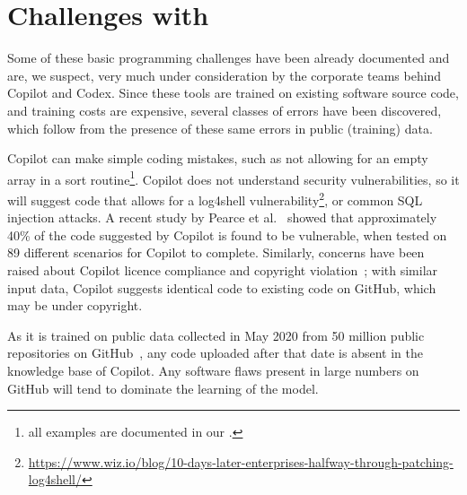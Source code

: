 \section{Challenges with \cct{}}
\label{challenges}
Some of these basic programming challenges have been already documented and are, we suspect, very much under consideration by the corporate teams behind Copilot and Codex. Since these tools are trained on existing software source code, and training costs are expensive, several classes of errors have been discovered, which follow from the presence of these same errors in public (training) data.

Copilot can make simple coding mistakes, such as not allowing for an empty array in a sort routine\footnote{all examples are documented in our \repl{}.}. Copilot does not understand security vulnerabilities, so it will suggest code that allows for a \textsf{log4shell} vulnerability\footnote{\url{https://www.wiz.io/blog/10-days-later-enterprises-halfway-through-patching-log4shell/}}, or common SQL injection attacks. A recent study by Pearce et al.~\cite{copilot_security} showed that approximately 40\% of the code suggested by Copilot is found to be vulnerable, when tested on 89 different scenarios for Copilot to complete.
Similarly, concerns have been raised about Copilot licence compliance and copyright violation~\cite{code_clone}; with similar input data, Copilot suggests identical code to existing code on GitHub, which may be under copyright. 

As it is trained on public data collected in May 2020 from 50 million public repositories on GitHub~\cite{copilot}, any code uploaded after that date is absent in the knowledge base of Copilot. 
Any software flaws present in large numbers on GitHub will tend to dominate the learning of the model.

